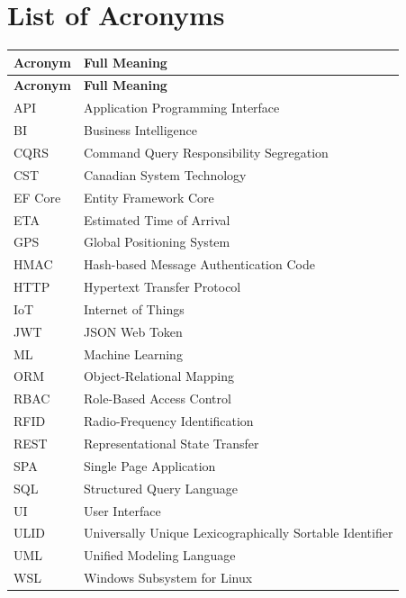\chapter*{List of Acronyms}

\begin{longtable}{p{3.5cm}p{10cm}}
\toprule
\textbf{Acronym} & \textbf{Full Meaning} \\
\midrule
\endfirsthead
\toprule
\textbf{Acronym} & \textbf{Full Meaning} \\
\midrule
\endhead
\bottomrule
\endlastfoot
API & Application Programming Interface \\
BI & Business Intelligence \\
CQRS & Command Query Responsibility Segregation \\
CST & Canadian System Technology \\
EF Core & Entity Framework Core \\
ETA & Estimated Time of Arrival \\
GPS & Global Positioning System \\
HMAC & Hash-based Message Authentication Code \\
HTTP & Hypertext Transfer Protocol \\
IoT & Internet of Things \\
JWT & JSON Web Token \\
ML & Machine Learning \\
ORM & Object-Relational Mapping \\
RBAC & Role-Based Access Control \\
RFID & Radio-Frequency Identification \\
REST & Representational State Transfer \\
SPA & Single Page Application \\
SQL & Structured Query Language \\
UI & User Interface \\
ULID & Universally Unique Lexicographically Sortable Identifier \\
UML & Unified Modeling Language \\
WSL & Windows Subsystem for Linux \\
\end{longtable}
